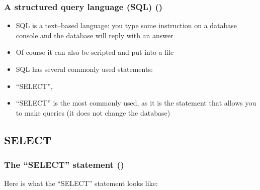 \documentclass[\printmode,compress,xcolor=dvipsnames]{beamer}
\begin{document}
\begin{frame}
  \frametitle<+->{A structured query language (SQL) ()}

  \begin{itemize}[<+- | alert@+->]

    \item SQL is a text--based language: you type some instruction on a database
            console and the database will reply with an answer

    \item Of course it can also be scripted and put into a file

    \item SQL has several commonly used statements:

    \item ``SELECT'', 

    \item ``SELECT'' is the most commonly used, as it is the statement that
            allows you to make queries (it does not change the database)

  \end{itemize}

\end{frame}

\subsection{SELECT}

\setcounter{ms}{0}
\begin{frame}
  \frametitle<+->{The ``SELECT'' statement ()}

  \alert{Here is what the ``SELECT'' statement looks like:}

  \begin{center}
  \begin{large}
  \end{large}
  \end{center}

\end{frame}
\end{document}
